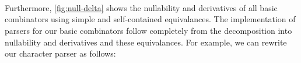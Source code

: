 \begin{code}[hide]
\AgdaSpace{}%
\AgdaSymbol{))}\AgdaSpace{}%
\AgdaSymbol{)}\<%
\\
%
\\[\AgdaEmptyExtraSkip]%
%
\>[4]\AgdaSpace{}%
\AgdaSymbol{=}\AgdaSpace{}%
\AgdaSpace{}%
\AgdaSpace{}%
\AgdaSymbol{())}\AgdaSpace{}%
\AgdaSpace{}%
\AgdaSymbol{())}\<%
\\
%
\>[4]\AgdaSpace{}%
\AgdaSymbol{=}\AgdaSpace{}%
\AgdaSpace{}%
\AgdaSpace{}%
\AgdaSymbol{\{}\AgdaSpace{}%
\AgdaSymbol{(}\AgdaSpace{}%
\AgdaOperator{\AgdaInductiveConstructor{,}}\AgdaSpace{}%
\AgdaSymbol{)}\AgdaSpace{}%
\AgdaSpace{}%
\AgdaSpace{}%
\AgdaSymbol{\})}\AgdaSpace{}%
\AgdaSpace{}%
\AgdaSymbol{\{}\AgdaSpace{}%
\AgdaSpace{}%
\AgdaSpace{}%
\AgdaSpace{}%
\AgdaOperator{\AgdaInductiveConstructor{,}}\AgdaSpace{}%
\AgdaSpace{}%
\AgdaSymbol{\})}\<%
\end{code}


Furthermore, \cref{fig:null-delta} shows the nullability and derivatives of all basic combinators using simple and self-contained equivalances.
The implementation of parsers for our basic combinators follow completely from the decomposition into nullability and derivatives and these equivalances.
For example, we can rewrite our character parser as follows:
%
\begin{code}%
%
\>[4]\AgdaSpace{}%
\AgdaSymbol{:}\AgdaSpace{}%
\AgdaSymbol{(}\AgdaSpace{}%
\AgdaSymbol{:}\AgdaSpace{}%
\AgdaSymbol{)}\AgdaSpace{}%
\AgdaSpace{}%
\AgdaSpace{}%
\AgdaSymbol{(}\AgdaSpace{}%
\AgdaSymbol{)}\<%
\\
%
\>[4]\AgdaSymbol{(}\AgdaSpace{}%
\AgdaSymbol{\AgdaUnderscore{})}\AgdaSpace{}%
\AgdaInductiveConstructor{[]}%
\>[26]\AgdaSymbol{=}\AgdaSpace{}%
\AgdaSpace{}%
\AgdaSpace{}%
\<%
\\
%
\>[4]\AgdaSymbol{(}\AgdaSpace{}%
\AgdaSymbol{)}\AgdaSpace{}%
\AgdaSymbol{(}\AgdaSpace{}%
\AgdaSpace{}%
\AgdaSymbol{)}%
\>[26]\AgdaSymbol{=}\AgdaSpace{}%
\AgdaSpace{}%
\AgdaSpace{}%
\AgdaSymbol{(((}\AgdaSpace{}%
\AgdaSpace{}%
\AgdaSymbol{)}\AgdaSpace{}%
\AgdaSpace{}%
\AgdaSymbol{)}\AgdaSpace{}%
\AgdaSymbol{)}\<%
\end{code}

